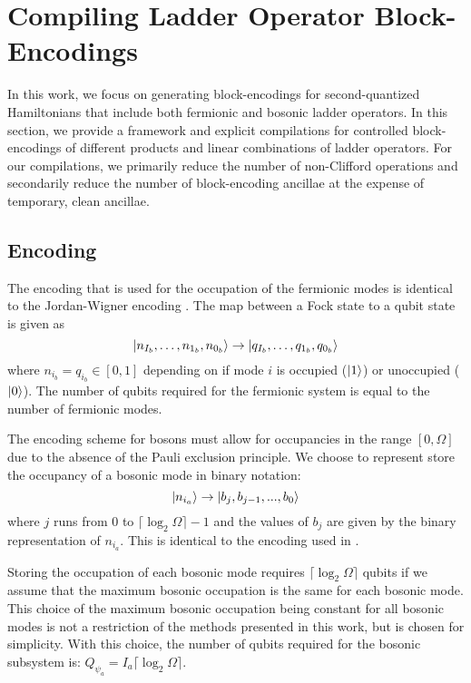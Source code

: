 \section{Compiling Ladder Operator Block-Encodings}
\label{sec:ladder-op-oracles}

In this work, we focus on generating block-encodings for second-quantized Hamiltonians that include both fermionic and bosonic ladder operators.
In this section, we provide a framework and explicit compilations for controlled block-encodings of different products and linear combinations of ladder operators.
For our compilations, we primarily reduce the number of non-Clifford operations and secondarily reduce the number of block-encoding ancillae at the expense of temporary, clean ancillae.

\subsection{Encoding}
\label{subsec:encoding}

The encoding that is used for the occupation of the fermionic modes is identical to the Jordan-Wigner encoding \cite{jordan-wigner}.
The map between a Fock state to a qubit state is given as 
\begin{equation}
    \ket{n_{I_b}, \dots, n_{1_b}, n_{0_b}} \rightarrow \ket{q_{I_b}, \dots, q_{1_b}, q_{0_b}}
\end{equation}
where $n_{i_b} = q_{i_b} \in [0, 1]$ depending on if mode $i$ is occupied ($\ket{1}$) or unoccupied ($\ket{0}$).
The number of qubits required for the fermionic system is equal to the number of fermionic modes.

The encoding scheme for bosons must allow for occupancies in the range $[0, \Omega]$ due to the absence of the Pauli exclusion principle.
We choose to represent store the occupancy of a bosonic mode in binary notation: 
\begin{equation}
    \ket{n_{i_a}} \rightarrow \ket{b_j, b_{j-1}, ..., b_0}
\end{equation}
where $j$ runs from $0$ to $\lceil \log_2{\Omega} \rceil - 1$ and the values of $b_j$ are given by the binary representation of $n_{i_a}$.
This is identical to the encoding used in \cite{rhodes2024exponential}. 

Storing the occupation of each bosonic mode requires $\lceil \log_2{\Omega} \rceil$ qubits if we assume that the maximum bosonic occupation is the same for each bosonic mode.
This choice of the maximum bosonic occupation being constant for all bosonic modes is not a restriction of the methods presented in this work, but is chosen for simplicity. 
With this choice, the number of qubits required for the bosonic subsystem is: $Q_{\psi_a} = I_a \lceil \log_2{\Omega} \rceil$.

